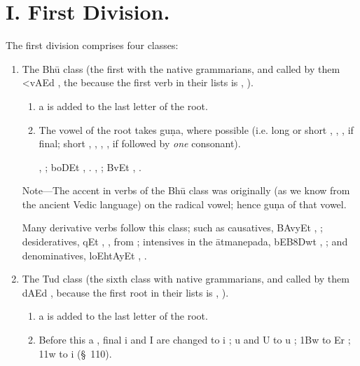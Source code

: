\section{I. First Division.}

\s The first division comprises four classes:

\begin{enumerate}
\item The Bhū class (the first with the native grammarians, and called
  by them {\dn <vAEd} , the because the first verb in their
  lists is {\dn {}} , ).

  \begin{enumerate}
  \item {\dn a}  is added to the last letter of the root.
  \item The vowel of the root takes guṇa, where possible (i.e. long or
    short , , , if final; short , ,
    , , if followed by \emph{one} consonant).

    {\dn {}} , ; {\dn boDEt} , . {\dn {}} , ; {\dn BvEt} ,
    .
  \end{enumerate}

  \begin{note}
    Note—The accent in verbs of the Bhū class was originally (as we know
    from the ancient Vedic language) on the radical vowel; hence guṇa of
    that vowel.

    Many derivative verbs follow this class; such as causatives,
    {\dn BAvyEt} , ; desideratives,
    {\dn {}qEt} , , from {\dn {}}
    ; intensives in the ātmanepada, {\dn b\?EB\38Dwt\?}
    , ; and denominatives,
    {\dn loEhtAyEt} , .
  \end{note}

\item The Tud class (the sixth class with native grammarians, and called
  by them {\dn {}dAEd} , because the first root in their lists
  is {\dn {}} , ).

  \begin{enumerate}
  \item {\dn a}  is added to the last letter of the root.
  \item Before this {\dn a} , final {\dn i}  and {\dn I}  are
    changed to {\dn i} ; {\dn u}  and {\dn U}  to {\dn u}
    ; {\dn \31Bw}  to {\dn Er} ; {\dn \311w}  to
    {\dn i}  (\S~110).


\end{enumerate}
\end{enumerate}
